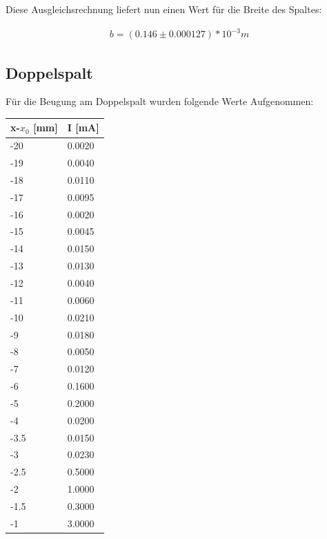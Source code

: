 Diese Ausgleichsrechnung liefert nun einen Wert für die Breite des Spaltes:

\begin{align*}
    b = (0.146\pm 0.000127)*10^{-3}m
\end{align*}

\subsection{Doppelspalt}

Für die Beugung am Doppelspalt wurden folgende Werte Aufgenommen:

\begin{minipage}{\linewidth}
    \begin{table}[H]
        \centering
    \begin{tabular}{ll}
        \toprule
        x-$x_0$ [mm] & I [mA] \\
        \midrule
        -20  &   0.0020 \\ 
        -19  &   0.0040 \\ 
        -18  &   0.0110  \\ 
        -17  &   0.0095  \\ 
        -16  &   0.0020   \\ 
        -15  &   0.0045  \\ 
        -14  &   0.0150 \\ 
        -13  &   0.0130  \\ 
        -12  &   0.0040  \\ 
        -11  &   0.0060 \\ 
        -10  &   0.0210 \\ 
        -9   &   0.0180  \\ 
        -8   &   0.0050 \\ 
        -7   &   0.0120 \\ 
        -6   &   0.1600  \\ 
        -5   &   0.2000 \\ 
        -4   &   0.0200 \\ 
        -3.5 &   0.0150   \\ 
        -3   &   0.0230   \\ 
        -2.5 &   0.5000   \\ 
        -2   &   1.0000    \\ 
        -1.5 &   0.3000   \\ 
        -1   &   3.0000   \\ 

\end{tabular}
\end{table}
\end{minipage}
